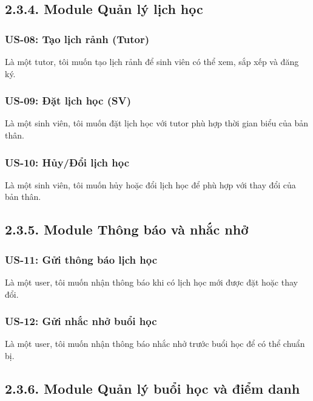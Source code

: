 
\subsection*{2.3.4. Module Quản lý lịch học}
\subsubsection*{US-08: Tạo lịch rảnh (Tutor)} 
Là một tutor, tôi muốn tạo lịch rảnh để sinh viên có thể xem, sắp xếp và đăng ký.

\subsubsection*{US-09: Đặt lịch học (SV)} 
Là một sinh viên, tôi muốn đặt lịch học với tutor phù hợp thời gian biểu của bản thân.

\subsubsection*{US-10: Hủy/Đổi lịch học} 
Là một sinh viên, tôi muốn hủy hoặc đổi lịch học để phù hợp với thay đổi của bản thân.


\subsection*{2.3.5. Module Thông báo và nhắc nhở}
\subsubsection*{US-11: Gửi thông báo lịch học} 
Là một user, tôi muốn nhận thông báo khi có lịch học mới được đặt hoặc thay đổi.

\subsubsection*{US-12: Gửi nhắc nhở buổi học} 
Là một user, tôi muốn nhận thông báo nhắc nhở trước buổi học để có thể chuẩn bị.


\subsection*{2.3.6. Module Quản lý buổi học và điểm danh}
